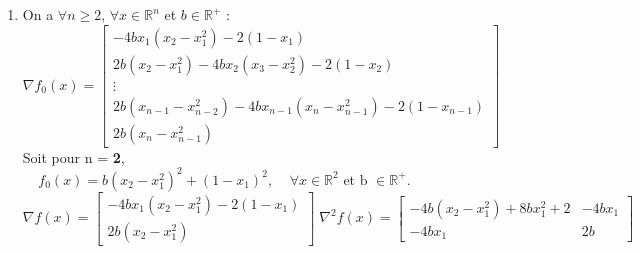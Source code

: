 \documentclass[12pt,a4paper,titlepage]{article}
\begin{document}
\begin{enumerate}
    \item{
            On a $\forall n \ge 2$, $\forall x \in \mathbb{R}^n$  et  $b \in \mathbb{R}^+$ :
            $$
            \nabla f_0(x) = \left[
                \begin{array}{c}
                    -4bx_1(x_2-x_1^2)-2(1-x_1) \\
                    2b(x_2-x_1^2)-4bx_2(x_3-x_2^2)-2(1-x_2) \\
                    \vdots \\
                    2b(x_{n-1}-x_{n-2}^2)-4bx_{n-1}(x_{n}-x_{n-1}^2)-2(1-x_{n-1}) \\
                    2b(x_n - x_{n-1}^2)
                \end{array}
            \right]
            \;\;\;\;\;
            $$
            Soit pour n = \textbf{2}, $ \;\;\;\;  f_0(x) = b(x_2-x_1^2)^2+(1-x_1)^2, \;\;\;\;    \forall x \in \mathbb{R}^2 \mbox{ et b }  \in \mathbb{R}^+.$
            $$
            \nabla f(x) = \left[
                \begin{array}{c}
                    -4bx_1(x_2-x_1^2) - 2(1-x_1)\\
                    2b(x_2-x_1^2)
                \end{array}
            \right]
            \;
            \nabla ^2f(x)=\left[
                \begin{array}{cc}
                    -4b(x_2-x_1^2)+8bx_1^2 +2 & -4bx_1\\
                    -4bx_1 & 2b
                \end{array}
            \right]
            $$
        }


\end{enumerate}
\end{document}
